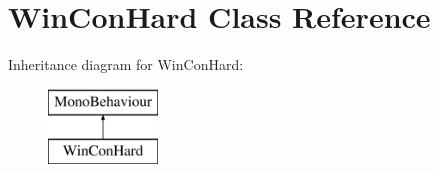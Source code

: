 \hypertarget{class_win_con_hard}{}\section{Win\+Con\+Hard Class Reference}
\label{class_win_con_hard}
Inheritance diagram for Win\+Con\+Hard\+:\begin{figure}[H]
\begin{center}
\leavevmode
\includegraphics[height=2.000000cm]{class_win_con_hard}
\end{center}
\end{figure}

